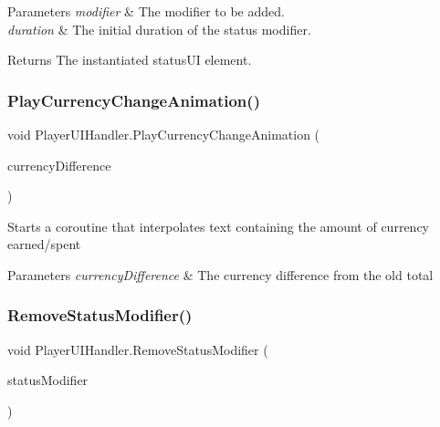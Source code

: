 \begin{DoxyParams}{Parameters}
{\em modifier} & The modifier to be added.\\
\hline
{\em duration} & The initial duration of the status modifier.\\
\hline
\end{DoxyParams}
\begin{DoxyReturn}{Returns}
The instantiated status\+UI element.
\end{DoxyReturn}
\hypertarget{class_player_u_i_handler_a86672aa016a9bdec4b8eebd3ece87f87}{}\label{class_player_u_i_handler_a86672aa016a9bdec4b8eebd3ece87f87} 
\subsubsection{\texorpdfstring{Play\+Currency\+Change\+Animation()}{PlayCurrencyChangeAnimation()}}
{\footnotesize\ttfamily void Player\+U\+I\+Handler.\+Play\+Currency\+Change\+Animation (\begin{DoxyParamCaption}\item[{float}]{currency\+Difference }\end{DoxyParamCaption})}



Starts a coroutine that interpolates text containing the amount of currency earned/spent 


\begin{DoxyParams}{Parameters}
{\em currency\+Difference} & The currency difference from the old total\\
\hline
\end{DoxyParams}
\hypertarget{class_player_u_i_handler_a0c18f57891bb979fe8377af65c6c4729}{}\label{class_player_u_i_handler_a0c18f57891bb979fe8377af65c6c4729} 
\subsubsection{\texorpdfstring{Remove\+Status\+Modifier()}{RemoveStatusModifier()}}
{\footnotesize\ttfamily void Player\+U\+I\+Handler.\+Remove\+Status\+Modifier (\begin{DoxyParamCaption}\item[{\hyperlink{class_status_u_i}{Status\+UI}}]{status\+Modifier }\end{DoxyParamCaption})}



